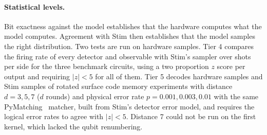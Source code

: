 \paragraph{Statistical levels.} Bit exactness against the model establishes that the hardware computes what the model
computes. Agreement with Stim then establishes that the model samples the right distribution. Two tests are run on
hardware samples. Tier 4 compares the firing rate of every detector and observable with Stim's sampler over
\NumTierFourShots{} shots per side for the three benchmark circuits, using a two proportion $z$ score per output and
requiring $|z|<5$ for all of them. Tier 5 decodes hardware samples and Stim samples of rotated surface code memory
experiments with distance $d=3,5,7$ ($d$ rounds) and physical error rate $p=0.001,0.003,0.01$ with the same
PyMatching~\cite{higgott2022pymatching,higgott2025sparse} matcher, built from Stim's detector error model, and requires
the logical error rates to agree with $|z|<5$. Distance 7 could not be run on the first kernel, which lacked the
qubit renumbering.
